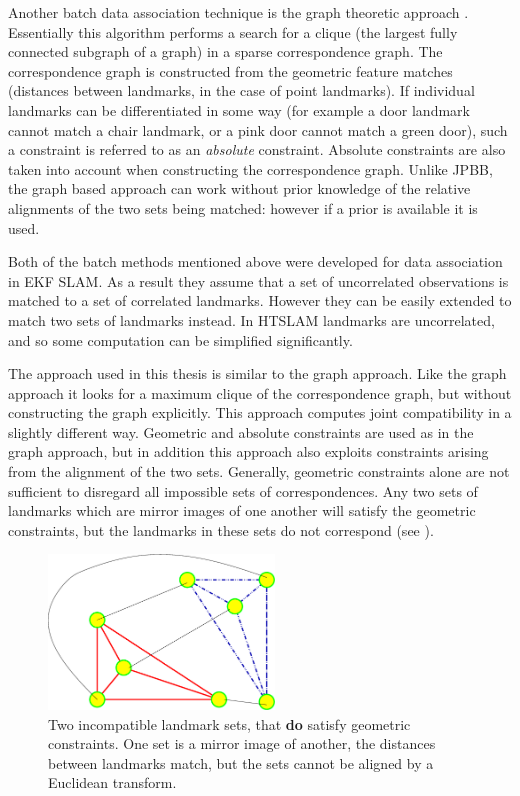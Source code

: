 Another batch data association technique is the graph theoretic
approach \cite{tardos02:_mappin_local_indoor_envir_using_sonar_data}.
Essentially this algorithm performs a search for a clique (the largest
fully connected subgraph of a graph) in a sparse correspondence graph.
The correspondence graph is constructed from the geometric feature
matches (distances between landmarks, in the case of point landmarks).
If individual landmarks can be differentiated in some way (for example
a door landmark cannot match a chair landmark, or a pink door cannot match
a green door), such a constraint is referred to as an {\it absolute}
constraint. Absolute constraints are also taken into account when
constructing the correspondence graph. Unlike JPBB, the graph based
approach can work without prior knowledge of the relative alignments
of the two sets being matched: however if a prior is available it is
used.

Both of the batch methods mentioned above were developed for data
association in EKF SLAM. As a result they assume that a set of
uncorrelated observations is matched to a set of correlated
landmarks. However they can be easily extended to match two sets of
landmarks instead. In HTSLAM landmarks are uncorrelated, and so some
computation can be simplified significantly.

The approach used in this thesis is similar to the graph approach.
Like the graph approach it looks for a maximum clique of the
correspondence graph, but without constructing the graph explicitly.
This approach computes joint compatibility in a slightly different
way. Geometric and absolute constraints are used as in the graph
approach, but in addition this approach also exploits constraints
arising from the alignment of the two sets. Generally, geometric
constraints alone are not sufficient to disregard all impossible sets
of correspondences. Any two sets of landmarks which are mirror images
of one another will satisfy the geometric constraints, but the
landmarks in these sets do not correspond (see
).

\begin{figure}[htbp]
  \centering
  \includegraphics[width=6cm]{Pics/fig_mirror_sets}
  \caption{Two incompatible landmark sets, that {\bf do} satisfy
    geometric constraints. One set is a mirror image of another, the
    distances between landmarks match, but the sets cannot be aligned
    by a Euclidean transform.
}
  \label{fig:mirror_sets}
\end{figure}

